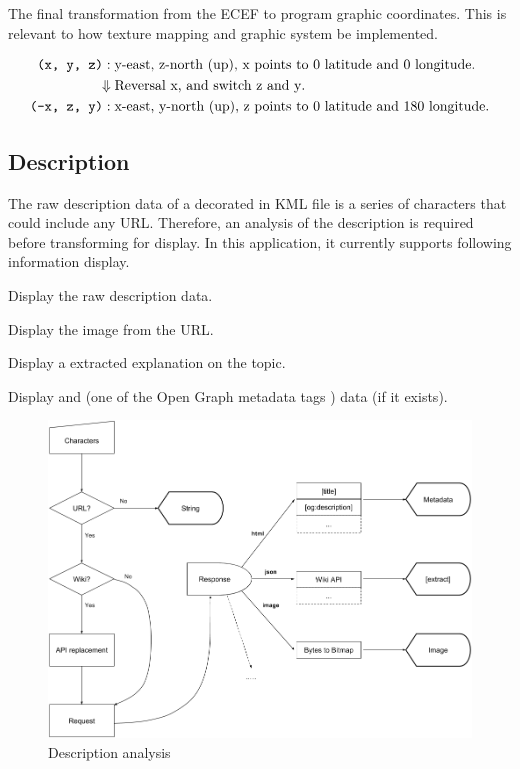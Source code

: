 The final transformation from the ECEF to program graphic coordinates. This is relevant to how texture mapping and graphic system be implemented.

\[
\begin{array}{lr}
\begin{aligned}
\texttt{(x, y, z)}:\;&\text{y-east, z-north (up), x points to $0$ latitude and $0$ longitude}.\\
\Downarrow\;&\text{Reversal x, and switch z and y}.\\
\texttt{(-x, z, y)}:\;&\text{x-east, y-north (up), z points to $0$ latitude and $180$ longitude}.\\
\end{aligned}
\end{array}
\]

\subsection{Description}

The raw description data of a  decorated in KML file is a series of characters that could include any URL. Therefore, an analysis of the description is required before transforming for display. In this application, it currently supports following information display.

\begin{description}
\setlength{\parskip}{0pt}
\item[$\bullet$ Plain text] Display the raw description data.
\item[$\bullet$ Image] Display the image from the URL.
\item[$\bullet$ Wikipedia] Display a extracted explanation on the topic.
\item[$\bullet$ HTML] Display  and  (one of the Open Graph metadata tags \cite{ogp.2014}) data (if it exists).
\end{description}

\begin{figure}[H]
\caption{Description analysis}
\label{fig:description-analysis}
\centering
\includegraphics[width=\textwidth, keepaspectratio]{Figures/description-analysis.png}
\decoRule
\end{figure}


